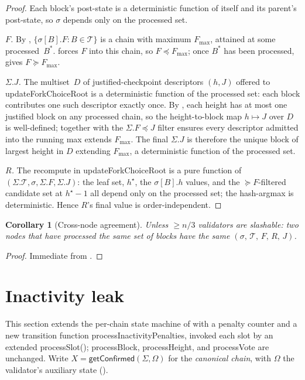 \documentclass{article}
\newcommand{\T}[0]{\ensuremath{\mathcal{T}}}
\newcommand{\processSlot}{\textsf{processSlot}\xspace}
\newcommand{\processBlock}{\textsf{processBlock}\xspace}
\newcommand{\processHeight}{\textsf{processHeight}\xspace}
\newcommand{\processVote}{\textsf{processVote}\xspace}
\newcommand{\processInactivityPenalties}{\textsf{processInactivityPenalties}\xspace}
\newcommand{\updateForkChoiceRoot}{\textsf{updateForkChoiceRoot}\xspace}
\newcommand{\getConfirmed}{\textsf{getConfirmed}\xspace}
\theoremstyle{plain}
\newtheorem{corollary}{Corollary}
\theoremstyle{definition}
\theoremstyle{remark}
\begin{document}
\begin{proof}
Each block's post-state is a deterministic function of itself and its parent's post-state, so $\sigma$ depends only on the processed set.

\emph{$F$.} By , $\{\sigma[B].F : B \in \T\}$ is a chain with maximum $F_{\max}$, attained at some processed~$B^\ast$.
 forces $F$ into this chain, so $F \preceq F_{\max}$; once $B^\ast$ has been processed,  gives $F \succeq F_{\max}$.

\emph{$\Sigma.J$.} The multiset~$D$ of justified-checkpoint descriptors $(h, J)$ offered to \updateForkChoiceRoot is a deterministic function of the processed set: each block contributes one such descriptor exactly once.
By , each height has at most one justified block on any processed chain, so the height-to-block map $h \mapsto J$ over $D$ is well-defined;  together with the $\Sigma.F \preceq J$ filter ensures every descriptor admitted into the running max extends $F_{\max}$.
The final $\Sigma.J$ is therefore the unique block of largest height in $D$ extending $F_{\max}$, a deterministic function of the processed set.

\emph{$R$.} The recompute in \updateForkChoiceRoot is a pure function of $(\Sigma.\T, \sigma, \Sigma.F, \Sigma.J)$: the leaf set, $h^\star$, the $\sigma[B].h$ values, and the $\succeq F$-filtered candidate set at $h^\star - 1$ all depend only on the processed set; the hash-argmax is deterministic. Hence $R$'s final value is order-independent.
\end{proof}

\begin{corollary}[Cross-node agreement]\label{cor:agreement}
Unless $\geq n/3$ validators are slashable: two nodes that have processed the same set of blocks have the same $(\sigma,\, \T,\, F,\, R,\, J)$.
\end{corollary}

\begin{proof}
Immediate from .
\end{proof}

\section{Inactivity leak}

This section extends the per-chain state machine of  with a penalty counter and a new transition function \processInactivityPenalties, invoked each slot by an extended \processSlot (); \processBlock, \processHeight, and \processVote are unchanged.
Write $X = \getConfirmed(\Sigma, \Omega)$ for the \emph{canonical chain}, with $\Omega$ the validator's auxiliary state ().
\end{document}
